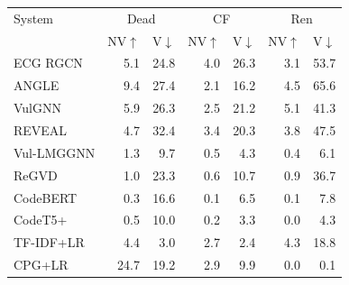 \begin{tabular}{lrrrrrr}
\toprule
System & \multicolumn{2}{c}{Dead} & \multicolumn{2}{c}{CF} & \multicolumn{2}{c}{Ren} \\
 & NV$\uparrow$ & V$\downarrow$ & NV$\uparrow$ & V$\downarrow$ & NV$\uparrow$ & V$\downarrow$ \\
\midrule
ECG RGCN & 5.1 & 24.8 & 4.0 & 26.3 & 3.1 & 53.7 \\
ANGLE & 9.4 & 27.4 & 2.1 & 16.2 & 4.5 & 65.6 \\
VulGNN & 5.9 & 26.3 & 2.5 & 21.2 & 5.1 & 41.3 \\
REVEAL & 4.7 & 32.4 & 3.4 & 20.3 & 3.8 & 47.5 \\
Vul-LMGGNN & 1.3 & 9.7 & 0.5 & 4.3 & 0.4 & 6.1 \\
ReGVD & 1.0 & 23.3 & 0.6 & 10.7 & 0.9 & 36.7 \\
CodeBERT & 0.3 & 16.6 & 0.1 & 6.5 & 0.1 & 7.8 \\
CodeT5+ & 0.5 & 10.0 & 0.2 & 3.3 & 0.0 & 4.3 \\
TF-IDF+LR & 4.4 & 3.0 & 2.7 & 2.4 & 4.3 & 18.8 \\
CPG+LR & 24.7 & 19.2 & 2.9 & 9.9 & 0.0 & 0.1 \\
\bottomrule
\end{tabular}
